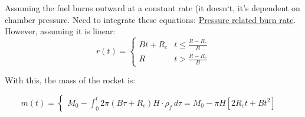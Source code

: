 \documentclass[12pt,a4paper]{article}
\begin{document}
Assuming the fuel burns outward at a constant rate (it doesn‘t, it’s dependent on chamber pressure. Need to integrate these equations: \hyperlink{https://www.nakka-rocketry.net/burnrate.html}{Pressure related burn rate}. However, assuming it is linear:
\begin{equation}
r(t) = \begin{cases}
Bt + R_c & t \le \frac{R - R_c}{B} \\
R      & t > \frac{R - R_c}{B}
\end{cases}
\label{eq:inner-radius}
\end{equation}

With this, the mass of the rocket is:

\begin{equation}
m(t) = \begin{cases}M_0 - \int_0^t 2\pi (B\tau+R_c) H\cdot \rho_f\,d\tau = M_0 - \pi H \left[2R_c t + Bt^2\right] & 
\end{cases}
\label{eq:mass}
\end{equation}
\end{document}
